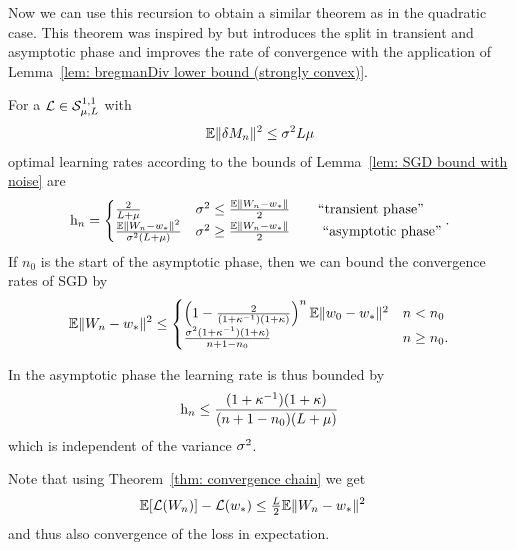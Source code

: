 Now we can use this recursion to obtain a similar theorem as in the quadratic
case. This theorem was inspired by
\textcite{nemirovskiRobustStochasticApproximation2009} but introduces the split
in transient and asymptotic phase and improves the rate of convergence with the
application of Lemma~\ref{lem: bregmanDiv lower bound (strongly convex)}.

\begin{theorem}\label{thm: optimal rates SGD}
	For a \(\mathcal{L}\in\mathcal{S}^{1,1}_{{\mu},{L}}\) with
	\begin{align*}
		\mathbb{E}\|\delta M_n\|^2 \le \sigma^2L\mu
	\end{align*}
	optimal learning rates according to the bounds of Lemma~\ref{lem: SGD bound with noise} are
	\begin{align*}
		\text{h}_n
		= \begin{cases}
			\frac{2}{L+\mu}
			& \sigma^2 \le \frac{\mathbb{E}\|W_n - w_*\|}{2}
			\qquad \text{``transient phase''}\\
			\frac{\mathbb{E}\|W_n -w_*\|^2}{\sigma^2(L+\mu)}
			& \sigma^2 \ge \frac{\mathbb{E}\|W_n - w_*\|}{2}
			\qquad \text{ ``asymptotic phase''}
		\end{cases}.
	\end{align*}
	If \(n_0\) is the start of the asymptotic phase, then we can bound the
	convergence rates of SGD by
	\begin{align*}
		\mathbb{E}\|W_n - w_*\|^2
		\le \begin{cases}
			\left(1-\frac{2}{(1+\kappa^{-1})(1+\kappa)}\right)^n\mathbb{E}\|w_0 -w_*\|^2
			& n < n_0\\
			\frac{\sigma^2(1+\kappa^{-1})(1+\kappa)}{n+1-n_0} & n \ge n_0.
		\end{cases}
	\end{align*}
\end{theorem}
\begin{remark}
	In the asymptotic phase the learning rate is thus bounded by
	\begin{align*}
		\text{h}_n \le \frac{(1+\kappa^{-1})(1+\kappa)}{(n+1-n_0)(L + \mu)}
	\end{align*}
	which is independent of the variance \(\sigma^2\).
\end{remark}
\begin{remark}\label{rem: expected loss is a special case of L2 weight convergence}
	Note that using Theorem~\ref{thm: convergence chain} we get
	\begin{align*}
		\mathbb{E}[\mathcal{L}(W_n)]- \mathcal{L}(w_*)
		&\le \tfrac{L}{2}\mathbb{E}\|W_n-w_*\|^2
	\end{align*}
	and thus also convergence of the loss in expectation.
\end{remark}

